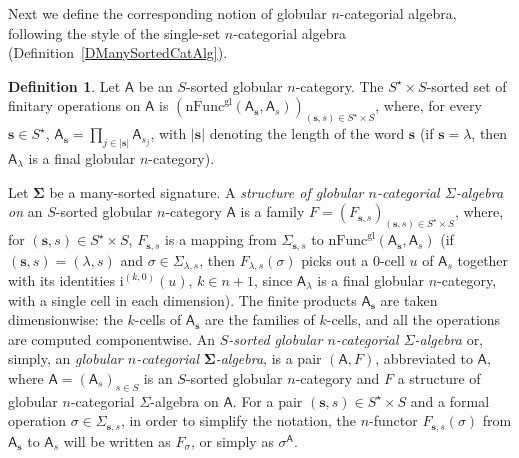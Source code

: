 \documentclass[a4paper, reqno
]{amsart}
\newcommand{\bb}[1]{\ensuremath{\lvert #1 \rvert}}
\newcommand{\sig}[1]{\mathbf{#1}}             %
\newcommand{\calg}[1]{\boldsymbol{\mathsf{#1}}} %
\newcommand{\gl}{\mathrm{gl}}                %
\theoremstyle{plain}
\theoremstyle{definition}
\newtheorem{definition}[theorem]{Definition}
\begin{document}
Next we define the corresponding notion of globular $n$-categorial algebra, following the style of the single-set $n$-categorial algebra (Definition~\ref{DManySortedCatAlg}).

\begin{definition}\label{DGlCatAlg}
Let $\mathsf{A}$ be an $S$-sorted globular $n$-category.
The $S^{\star}\times S$-sorted set of finitary operations on $\mathsf{A}$ is $(\mathrm{nFunc}^{\gl}(\mathsf{A}_{\mathbf{s}},\mathsf{A}_{s}))_{(\mathbf{s},s)\in S^{\star}\times S}$, where, for every $\mathbf{s}\in S^{\star}$, $\mathsf{A}_{\mathbf{s}}=\prod_{j\in\bb{\mathbf{s}}}\mathsf{A}_{s_{j}}$, with $\bb{\mathbf{s}}$ denoting the length of the word $\mathbf{s}$ (if $\mathbf{s}=\lambda$, then $\mathsf{A}_{\lambda}$ is a final globular $n$-category).

Let $\sig{\Sigma}$ be a many-sorted signature.
A \emph{structure of globular $n$-categorial $\Sigma$-algebra on} an $S$-sorted globular $n$-category $\mathsf{A}$ is a family $F = (F_{\mathbf{s},s})_{(\mathbf{s},s)\in S^{\star}\times S}$, where, for $(\mathbf{s},s)\in S^{\star}\times S$, $F_{\mathbf{s},s}$ is a mapping from $\Sigma_{\mathbf{s},s}$ to $\mathrm{nFunc}^{\gl}(\mathsf{A}_{\mathbf{s}},\mathsf{A}_{s})$ (if $(\mathbf{s},s) = (\lambda,s)$ and $\sigma\in \Sigma_{\lambda,s}$, then $F_{\lambda,s}(\sigma)$ picks out a $0$-cell $u$ of $\mathsf{A}_{s}$ together with its identities $\mathrm{i}^{(k,0)}(u)$, $k\in n+1$, since $\mathsf{A}_{\lambda}$ is a final globular $n$-category, with a single cell in each dimension).
The finite products $\mathsf{A}_{\mathbf{s}}$ are taken dimensionwise: the $k$-cells of $\mathsf{A}_{\mathbf{s}}$ are the families of $k$-cells, and all the operations are computed componentwise.
An \emph{$S$-sorted globular $n$-categorial $\Sigma$-algebra} or, simply, an \emph{globular $n$-categorial $\sig{\Sigma}$-algebra}, is a pair $(\mathsf{A},F)$, abbreviated to $\calg{A}$, where $\mathsf{A}=(\mathsf{A}_{s})_{s\in S}$ is an $S$-sorted globular $n$-category and $F$ a structure of globular $n$-categorial $\Sigma$-algebra on $\mathsf{A}$.
For a pair $(\mathbf{s},s)\in S^{\star}\times S$ and a formal operation $\sigma\in \Sigma_{\mathbf{s},s}$, in order to simplify the notation, the $n$-functor $F_{\mathbf{s},s}(\sigma)$ from $\mathsf{A}_{\mathbf{s}}$ to $\mathsf{A}_{s}$ will be written as $F_{\sigma}$, or simply as $\sigma^{\calg{A}}$.


\end{definition}
\end{document}
